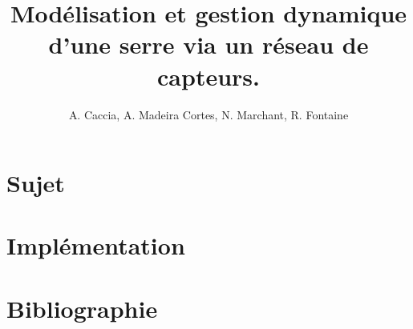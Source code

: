 \documentclass[a4paper,10pt]{article}
\title{Modélisation et gestion dynamique d'une serre via un réseau de capteurs.}
\author{A. Caccia, A. Madeira Cortes, N. Marchant, R. Fontaine}
\date{ }
\begin{document}
\maketitle

\vspace{2cm}

\section{Sujet}

\section{Implémentation}

\section{Bibliographie}
\end{document}
